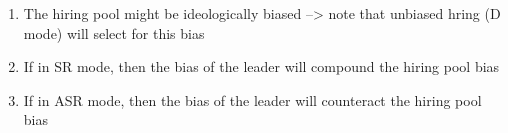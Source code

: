 \documentclass[]{article}
\providecommand{\tightlist}{%
  \setlength{\itemsep}{0pt}\setlength{\parskip}{0pt}}
\begin{document}
\begin{enumerate}
  \begin{enumerate}
  \def\labelenumii{\arabic{enumii}.}
  \tightlist
  \item
    The hiring pool might be ideologically biased --\textgreater{} note
    that unbiased hring (D mode) will select for this bias
  \item
    If in SR mode, then the bias of the leader will compound the hiring
    pool bias
  \item
    If in ASR mode, then the bias of the leader will counteract the
    hiring pool bias
  \end{enumerate}
\end{enumerate}
\end{document}

